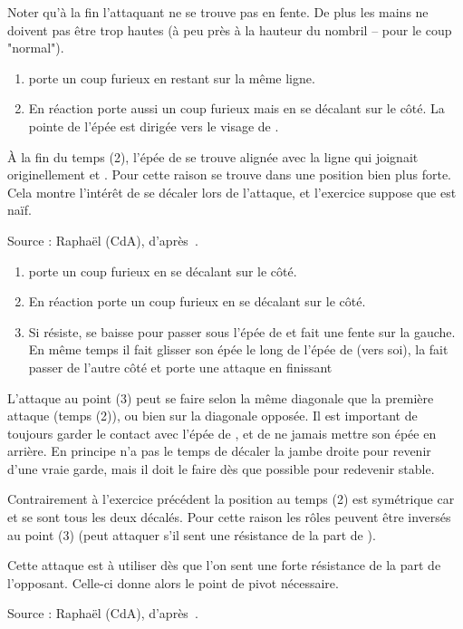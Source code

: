 Noter qu'à la fin l'attaquant ne se trouve pas en fente.
De plus les mains ne doivent pas être trop hautes (à peu près à la hauteur du nombril – pour le coup "normal").

\begin{exercice}

\begin{enumerate}
	\item \A porte un coup furieux en restant sur la même ligne.
	
	\item En réaction \D porte aussi un coup furieux mais en se décalant sur le côté.
	La pointe de l'épée est dirigée vers le visage de \A.
\end{enumerate}

À la fin du temps (2), l'épée de \D se trouve alignée avec la ligne qui joignait originellement \A et \D.
Pour cette raison \D se trouve dans une position bien plus forte.
Cela montre l'intérêt de se décaler lors de l'attaque, et l'exercice suppose que \A est naïf.

Source : Raphaël (CdA), d'après~\cite[fol.~19r-20v, §1, p.~16]{farrell:ringeck}.
\end{exercice}

\begin{exercice}

\begin{enumerate}
	\item \A porte un coup furieux en se décalant sur le côté.
	
	\item En réaction \D porte un coup furieux en se décalant sur le côté.
	
	\item Si \A résiste, \D se baisse pour passer sous l'épée de \A et fait une fente sur la gauche.
	En même temps il fait glisser son épée le long de l'épée de \A (vers soi), la fait passer de l'autre côté et porte une attaque en finissant 
\end{enumerate}

L'attaque au point (3) peut se faire selon la même diagonale que la première attaque (temps (2)), ou bien sur la diagonale opposée.
Il est important de toujours garder le contact avec l'épée de \A, et de ne jamais mettre son épée en arrière.
En principe \D n'a pas le temps de décaler la jambe droite pour revenir d'une vraie garde, mais il doit le faire dès que possible pour redevenir stable.

Contrairement à l'exercice précédent la position au temps (2) est symétrique car \A et \D se sont tous les deux décalés.
Pour cette raison les rôles peuvent être inversés au point (3) (\A peut attaquer s'il sent une résistance de la part de \D).

Cette attaque est à utiliser dès que l'on sent une forte résistance de la part de l'opposant.
Celle-ci donne alors le point de pivot nécessaire.

Source : Raphaël (CdA), d'après~\cite[fol.~19r-20v, §2, p.~16]{farrell:ringeck}.
\end{exercice}


